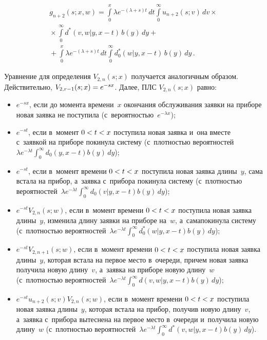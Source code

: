 \begin{multicols}{2}
\vspace*{-12pt}

\noindent
\begin{multline*}
g_{n+2}(s;x,w) = \int\limits_0^x \lambda e^{-(\lambda+s) t}\,dt
\int\limits_0^\infty u_{n+2}(s;v)  \, dv\times{}\\
{}\times
\int\limits_0^\infty d^*(v,w|y,x-t)\, b(y)\, dy
+{}\\
{}+
\int\limits_0^x \lambda e^{-(\lambda+s) t}\,dt \int\limits_0^\infty d^*_0(w|y,x-t)\, b(y)\, dy\,.
\end{multline*}

Уравнение для определения $V_{2,n}(s;x)$ получается  аналогичным образом.
Действительно, $V_{2,r-1}(s;x)\hm=e^{-s x}$.
Далее, ПЛС $V_{2,n}(s;x)$ равно:
\begin{itemize}
\item $e^{-s x}$, если до момента времени~$x$
окончания обслуживания заявки на приборе
новая заявка не поступила (с~вероятностью~$e^{-\lambda x}$);

\item  $e^{-s t}$, если в~момент $0\hm<t\hm<x$
поступила новая заявка и~она вместе с~заявкой на приборе покинула
систему (с~плотностью вероятностей~$\lambda e^{-\lambda t}
\int\nolimits_0^\infty d_0(y,x-t)b(y)\,dy$);

\item  $e^{-s t}$, если в~момент времени
$0\hm<t\hm<x$ поступила новая заявка длины~$y$, 
сама встала на прибор, а~заявка с~прибора покинула систему 
(с~плотностью вероятностей~$\lambda e^{-\lambda t}
\int\nolimits_0^\infty d_0(v|y,x-t) b(y)\, dy$);

\item $e^{-s t}V_{2,n}(s;w)$, если в~момент времени
$0\hm<t\hm<x$ поступила новая заявка длины~$y$,
изменила длину заявки на приборе на~$w$, 
а~сама\linebreak покинула систему (с~плотностью вероятностей~$\lambda e^{-\lambda t}
\int\nolimits_0^\infty d^*_0(w|y,x-t) b(y)\, dy$);

\item  $e^{-s t}V_{2,n+1}(s;w)$, если в~момент
времени $0\hm<t\hm<x$ поступила новая заявка длины~$y$, которая
встала на первое место в~очереди, причем новая заявка
получила новую длину~$v$, а~заявка на приборе новую
длину~$w$ (с~плотностью вероятностей~$\lambda e^{-\lambda t}
\int\nolimits_0^\infty d(v,w|y,x-t) b(y)\, dy$);

\item $e^{-s t}u_{n+2}(s;v)V_{2,n}(s;w)$, если в~момент
времени $0\hm<t\hm<x$ поступила новая заявка длины~$y$, которая встала на прибор, 
получив новую длину~$v$, а~заявка с~прибора вытеснена на первое место 
в~очереди и~получила новую длину~$w$ (с~плотностью вероятностей~$\lambda e^{-\lambda t}
\int\nolimits_0^\infty d^*(v,w|y,x-t) b(y)\, dy$).
\end{itemize}


\end{multicols}
